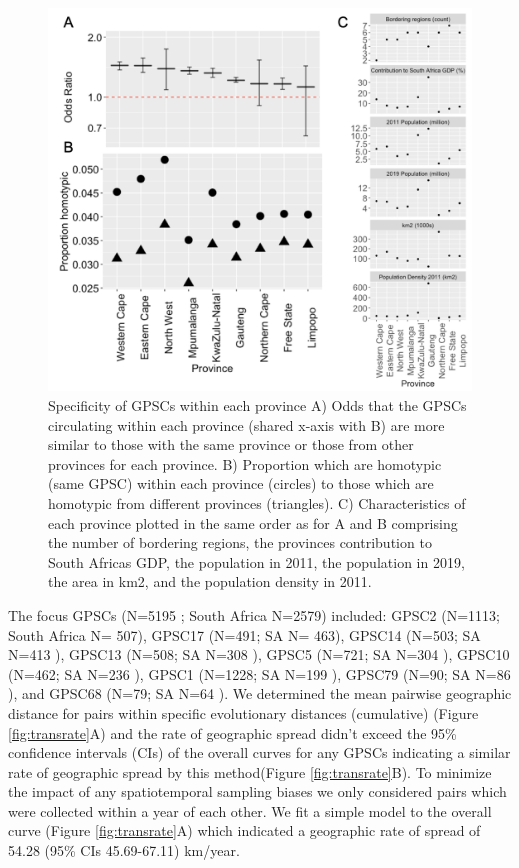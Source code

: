 \documentclass{article}
\begin{document}
\begin{figure}[H]
\centering
    \includegraphics[width=\textwidth]{withinvsbetween.png}
    \caption{Specificity of GPSCs within each province A) Odds that the GPSCs circulating within each province (shared x-axis with B) are more similar to those with the same province or those from other provinces for each province. B) Proportion which are homotypic (same GPSC) within each province (circles) to those which are homotypic from different provinces (triangles). C) Characteristics of each province plotted in the same order as for A and B comprising the number of bordering regions, the provinces contribution to South Africas GDP, the population in 2011, the population in 2019, the area in km2, and the population density in 2011.}
      \label{fig:withinbetween}
\end{figure}
The focus GPSCs  (N=5195 ; South Africa N=2579) included: GPSC2 (N=1113; South Africa N= 507), GPSC17 (N=491; SA N= 463), GPSC14 (N=503; SA N=413 ), GPSC13 (N=508; SA N=308 ), GPSC5 (N=721; SA N=304 ), GPSC10 (N=462; SA N=236 ), GPSC1 (N=1228; SA N=199 ), GPSC79 (N=90; SA N=86 ),  and GPSC68 (N=79; SA N=64 ). We determined the mean pairwise geographic distance for pairs within specific evolutionary distances (cumulative) (Figure \ref{fig:transrate}A) and the rate of geographic spread didn't exceed the 95\% confidence intervals (CIs) of the overall curves for any GPSCs indicating a similar rate of geographic spread by this method(Figure \ref{fig:transrate}B). To minimize the impact of any spatiotemporal sampling biases we only considered pairs which were collected within a year of each other. We fit a simple model to the overall curve (Figure \ref{fig:transrate}A) which indicated a geographic rate of spread of 54.28 (95\% CIs  45.69-67.11) km/year. 
\end{document}
